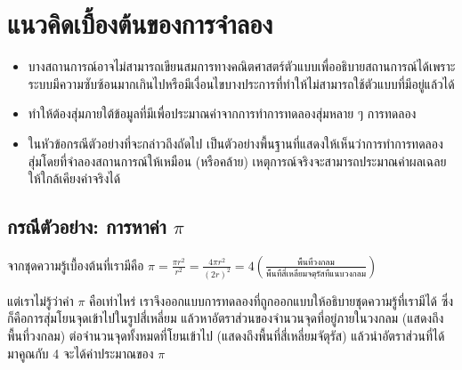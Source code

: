 \newpage
\section{แนวคิดเบื้องต้นของการจำลอง}
\begin{itemize}
    \item บางสถานการณ์อาจไม่สามารถเขียนสมการทางคณิตศาสตร์ตัวแบบเพื่ออธิบายสถานการณ์ได้เพราะระบบมีความซับซ้อนมากเกินไปหรือมีเงื่อนไขบางประการที่ทำให้ไม่สามารถใช้ตัวแบบที่มีอยู่แล้วได้
    \item ทำให้ต้องสุ่มภายใต้ข้อมูลที่มีเพื่อประมาณค่าจากการทำการทดลองสุ่มหลาย ๆ การทดลอง
    \item ในหัวข้อกรณีตัวอย่างที่จะกล่าวถึงถัดไป เป็นตัวอย่างพื้นฐานที่แสดงให้เห็นว่าการทำการทดลองสุ่มโดยที่จำลองสถานการณ์ให้เหมือน (หรือคล้าย) เหตุการณ์จริงจะสามารถประมาณค่าผลเฉลยให้ใกล้เคียงค่าจริงได้
\end{itemize}

\subsection{กรณีตัวอย่าง: การหาค่า $\pi$}
จากชุดความรู้เบื้องต้นที่เรามีคือ $\pi= \frac{\pi r^2}{r^2} = \frac{4\pi r^2}{(2r)^2} =4 \left( \frac{\text{พื้นที่วงกลม}}{\text{พื้นที่สี่เหลี่ยมจตุรัสที่แนบวงกลม}}\right)$
\begin{center}
\end{center}
แต่เราไม่รู้ว่าค่า $\pi$ คือเท่าไหร่ เราจึงออกแบบการทดลองที่ถูกออกแบบให้อธิบายชุดความรู้ที่เรามีได้ ซึ่งก็คือการสุ่มโยนจุดเข้าไปในรูปสี่เหลี่ยม แล้วหาอัตราส่วนของจำนวนจุดที่อยู่ภายในวงกลม (แสดงถึงพื้นที่วงกลม) ต่อจำนวนจุดทั้งหมดที่โยนเข้าไป (แสดงถึงพื้นที่สี่เหลี่ยมจัตุรัส) แล้วนำอัตราส่วนที่ได้มาคูณกับ 4 จะได้ค่าประมาณของ $\pi$

